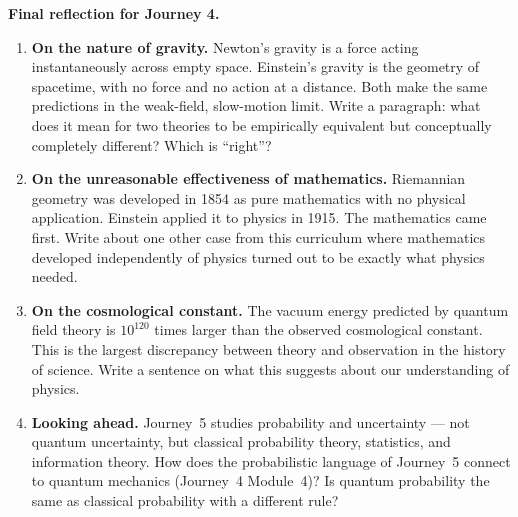 \documentclass[12pt,a4paper]{article}
\begin{document}
\begin{reflectionbox}
\textbf{Final reflection for Journey 4.}

\begin{enumerate}
  \item \textbf{On the nature of gravity.} Newton's gravity is a force acting instantaneously across empty space. Einstein's gravity is the geometry of spacetime, with no force and no action at a distance. Both make the same predictions in the weak-field, slow-motion limit. Write a paragraph: what does it mean for two theories to be empirically equivalent but conceptually completely different? Which is ``right''?

  \item \textbf{On the unreasonable effectiveness of mathematics.} Riemannian geometry was developed in 1854 as pure mathematics with no physical application. Einstein applied it to physics in 1915. The mathematics came first. Write about one other case from this curriculum where mathematics developed independently of physics turned out to be exactly what physics needed.

  \item \textbf{On the cosmological constant.} The vacuum energy predicted by quantum field theory is $10^{120}$ times larger than the observed cosmological constant. This is the largest discrepancy between theory and observation in the history of science. Write a sentence on what this suggests about our understanding of physics.

  \item \textbf{Looking ahead.} Journey~5 studies probability and uncertainty --- not quantum uncertainty, but classical probability theory, statistics, and information theory. How does the probabilistic language of Journey~5 connect to quantum mechanics (Journey~4 Module~4)? Is quantum probability the same as classical probability with a different rule?
\end{enumerate}
\end{reflectionbox}
\end{document}
